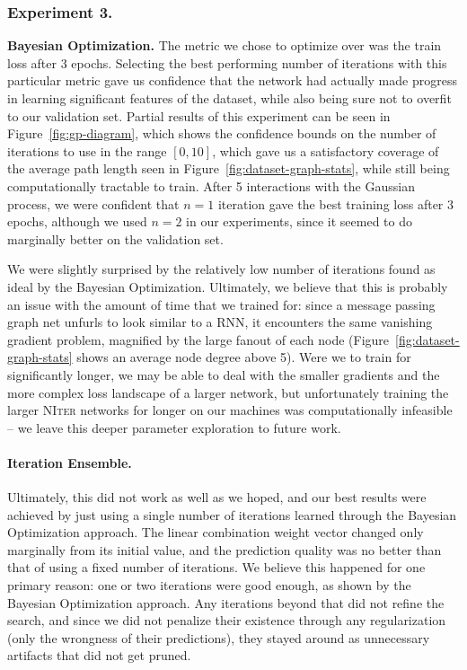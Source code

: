 \subsubsection{Experiment 3.}
\textbf{Bayesian Optimization.}
The metric we chose to optimize over was the train loss after 3 epochs.
Selecting the best performing number of iterations with this particular metric gave us confidence that the network had actually made progress in learning significant features of the dataset, while also being sure not to overfit to our validation set.
Partial results of this experiment can be seen in Figure~\ref{fig:gp-diagram}, which shows the confidence bounds on the number of iterations to use in the range $[0, 10]$, which gave us a satisfactory coverage of the average path length seen in Figure~\ref{fig:dataset-graph-stats}, while still being computationally tractable to train.
After 5 interactions with the Gaussian process, we were confident that $n=1$ iteration gave the best training loss after 3 epochs, although we used $n=2$ in our experiments, since it seemed to do marginally better on the validation set.

We were slightly surprised by the relatively low number of iterations found as ideal by the Bayesian Optimization.
Ultimately, we believe that this is probably an issue with the amount of time that we trained for: since a message passing graph net unfurls to look similar to a RNN, it encounters the same vanishing gradient problem, magnified by the large fanout of each node (Figure~\ref{fig:dataset-graph-stats} shows an average node degree above 5).
Were we to train for significantly longer, we may be able to deal with the smaller gradients and the more complex loss landscape of a larger network, but unfortunately training the larger \textsc{NIter} networks for longer on our machines was computationally infeasible -- we leave this deeper parameter exploration to future work.

\paragraph{Iteration Ensemble.}
Ultimately, this did not work as well as we hoped, and our best results were achieved by just using a single number of iterations learned through the Bayesian Optimization approach.
The linear combination weight vector changed only marginally from its initial value, and the prediction quality was no better than that of using a fixed number of iterations.
We believe this happened for one primary reason: one or two iterations were good enough, as shown by the Bayesian Optimization approach.
Any iterations beyond that did not refine the search, and since we did not penalize their existence through any regularization (only the wrongness of their predictions), they stayed around as unnecessary artifacts that did not get pruned.
